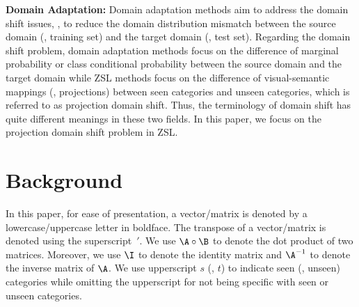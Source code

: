 \documentclass[journal]{IEEEtran}
\begin{document}
\noindent\textbf{Domain Adaptation:} Domain adaptation methods aim to address the domain shift issues, \ie, to reduce the domain distribution mismatch between the source domain (\ie, training set) and the target domain (\ie, test set). Regarding the domain shift problem, domain adaptation methods focus on the difference of marginal probability or class conditional probability between the source domain and the target domain while ZSL methods focus on the difference of visual-semantic mappings (\ie, projections) between seen categories and unseen categories, which is referred to as projection domain shift. Thus, the terminology of domain shift has quite different meanings in these two fields. In this paper, we focus on the projection domain shift problem in ZSL.

\section{Background} \label{sec:background}
In this paper, for ease of presentation, a vector/matrix is denoted by a lowercase/uppercase letter in boldface. The transpose of a vector/matrix is denoted using the superscript~$'$. We  use $\A\circ\B$ to denote the dot product of two matrices. Moreover, we use $\I$ to denote the identity matrix and $\A^{-1}$ to denote the inverse matrix of $\A$. We use upperscript $s$ (\resp, $t$) to indicate seen (\resp, unseen) categories while omitting the upperscript for not being specific with seen or unseen categories.
\end{document}

